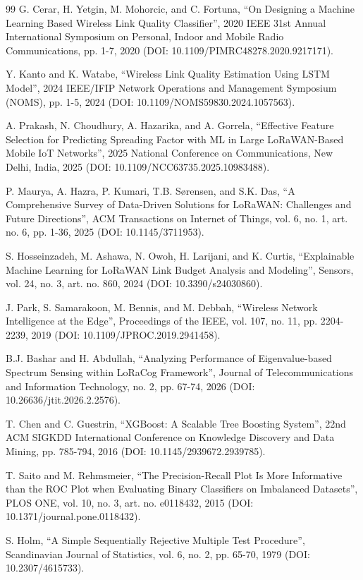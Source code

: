 \documentclass{jot}
\begin{document}
\begin{thebibliography}{99}
 G. Cerar, H. Yetgin, M. Mohorcic, and C. Fortuna, ``On Designing a Machine Learning Based Wireless Link Quality Classifier'', 2020 IEEE 31st Annual International Symposium on Personal, Indoor and Mobile Radio Communications, pp. 1-7, 2020 (DOI: 10.1109/PIMRC48278.2020.9217171).

 Y. Kanto and K. Watabe, ``Wireless Link Quality Estimation Using LSTM Model'', 2024 IEEE/IFIP Network Operations and Management Symposium (NOMS), pp. 1-5, 2024 (DOI: 10.1109/NOMS59830.2024.1057563).

 A. Prakash, N. Choudhury, A. Hazarika, and A. Gorrela, ``Effective Feature Selection for Predicting Spreading Factor with ML in Large LoRaWAN-Based Mobile IoT Networks'', 2025 National Conference on Communications, New Delhi, India, 2025 (DOI: 10.1109/NCC63735.2025.10983488).

 P. Maurya, A. Hazra, P. Kumari, T.B. Sørensen, and S.K. Das, ``A Comprehensive Survey of Data-Driven Solutions for LoRaWAN: Challenges and Future Directions'', ACM Transactions on Internet of Things, vol. 6, no. 1, art. no. 6, pp. 1-36, 2025 (DOI: 10.1145/3711953).

 S. Hosseinzadeh, M. Ashawa, N. Owoh, H. Larijani, and K. Curtis, ``Explainable Machine Learning for LoRaWAN Link Budget Analysis and Modeling'', Sensors, vol. 24, no. 3, art. no. 860, 2024 (DOI: 10.3390/s24030860).

 J. Park, S. Samarakoon, M. Bennis, and M. Debbah, ``Wireless Network Intelligence at the Edge'', Proceedings of the IEEE, vol. 107, no. 11, pp. 2204-2239, 2019 (DOI: 10.1109/JPROC.2019.2941458).

 B.J. Bashar and H. Abdullah, ``Analyzing Performance of Eigenvalue-based Spectrum Sensing within LoRaCog Framework'', Journal of Telecommunications and Information Technology, no. 2, pp. 67-74, 2026 (DOI: 10.26636/jtit.2026.2.2576).

 T. Chen and C. Guestrin, ``XGBoost: A Scalable Tree Boosting System'', 22nd ACM SIGKDD International Conference on Knowledge Discovery and Data Mining, pp. 785-794, 2016 (DOI: 10.1145/2939672.2939785).

 T. Saito and M. Rehmsmeier, ``The Precision-Recall Plot Is More Informative than the ROC Plot when Evaluating Binary Classifiers on Imbalanced Datasets'', PLOS ONE, vol. 10, no. 3, art. no. e0118432, 2015 (DOI: 10.1371/journal.pone.0118432).

 S. Holm, ``A Simple Sequentially Rejective Multiple Test Procedure'', Scandinavian Journal of Statistics, vol. 6, no. 2, pp. 65-70, 1979 (DOI: 10.2307/4615733).


\end{thebibliography}
\end{document}
